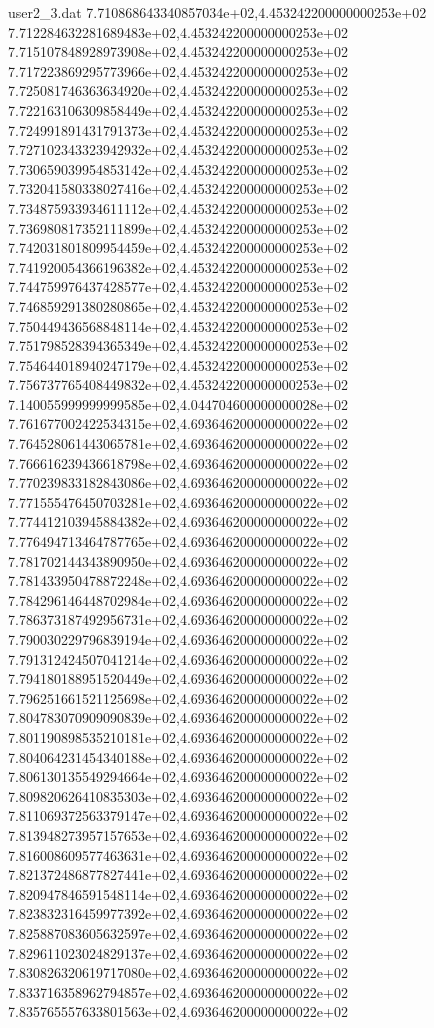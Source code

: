 \begin{filecontents}{user2_3.dat}
7.710868643340857034e+02,4.453242200000000253e+02
7.712284632281689483e+02,4.453242200000000253e+02
7.715107848928973908e+02,4.453242200000000253e+02
7.717223869295773966e+02,4.453242200000000253e+02
7.725081746363634920e+02,4.453242200000000253e+02
7.722163106309858449e+02,4.453242200000000253e+02
7.724991891431791373e+02,4.453242200000000253e+02
7.727102343323942932e+02,4.453242200000000253e+02
7.730659039954853142e+02,4.453242200000000253e+02
7.732041580338027416e+02,4.453242200000000253e+02
7.734875933934611112e+02,4.453242200000000253e+02
7.736980817352111899e+02,4.453242200000000253e+02
7.742031801809954459e+02,4.453242200000000253e+02
7.741920054366196382e+02,4.453242200000000253e+02
7.744759976437428577e+02,4.453242200000000253e+02
7.746859291380280865e+02,4.453242200000000253e+02
7.750449436568848114e+02,4.453242200000000253e+02
7.751798528394365349e+02,4.453242200000000253e+02
7.754644018940247179e+02,4.453242200000000253e+02
7.756737765408449832e+02,4.453242200000000253e+02
7.140055999999999585e+02,4.044704600000000028e+02
7.761677002422534315e+02,4.693646200000000022e+02
7.764528061443065781e+02,4.693646200000000022e+02
7.766616239436618798e+02,4.693646200000000022e+02
7.770239833182843086e+02,4.693646200000000022e+02
7.771555476450703281e+02,4.693646200000000022e+02
7.774412103945884382e+02,4.693646200000000022e+02
7.776494713464787765e+02,4.693646200000000022e+02
7.781702144343890950e+02,4.693646200000000022e+02
7.781433950478872248e+02,4.693646200000000022e+02
7.784296146448702984e+02,4.693646200000000022e+02
7.786373187492956731e+02,4.693646200000000022e+02
7.790030229796839194e+02,4.693646200000000022e+02
7.791312424507041214e+02,4.693646200000000022e+02
7.794180188951520449e+02,4.693646200000000022e+02
7.796251661521125698e+02,4.693646200000000022e+02
7.804783070909090839e+02,4.693646200000000022e+02
7.801190898535210181e+02,4.693646200000000022e+02
7.804064231454340188e+02,4.693646200000000022e+02
7.806130135549294664e+02,4.693646200000000022e+02
7.809820626410835303e+02,4.693646200000000022e+02
7.811069372563379147e+02,4.693646200000000022e+02
7.813948273957157653e+02,4.693646200000000022e+02
7.816008609577463631e+02,4.693646200000000022e+02
7.821372486877827441e+02,4.693646200000000022e+02
7.820947846591548114e+02,4.693646200000000022e+02
7.823832316459977392e+02,4.693646200000000022e+02
7.825887083605632597e+02,4.693646200000000022e+02
7.829611023024829137e+02,4.693646200000000022e+02
7.830826320619717080e+02,4.693646200000000022e+02
7.833716358962794857e+02,4.693646200000000022e+02
7.835765557633801563e+02,4.693646200000000022e+02

\end{filecontents}
